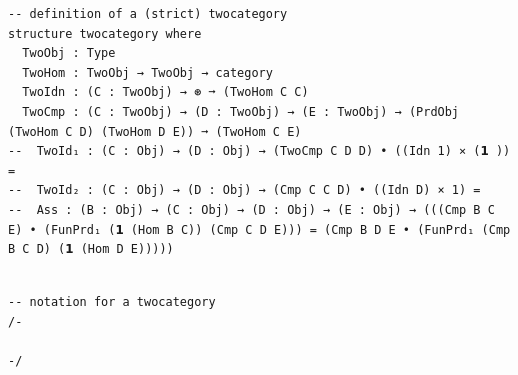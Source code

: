 \documentclass{book}
\newcounter{lcounter}
\newcounter{sectioncount}
\newcounter{subsectioncount}
\renewcommand{\section}[1]{\newpage
\ \\
\ \\
 \begin{center} \scalebox{1.5}{\texttt{\thesectioncount . #1}} \setcounter{sectioncount}{\thesectioncount+1} \setcounter{subsectioncount}{1} \end{center}
 \begin{center}

\ \\
\ \\

\thispagestyle{empty}
\end{center}
}
\begin{document}
\section{\texttt{twocategory}} %


\begin{center}
\begin{tcolorbox}[width=5in,colback={white},title={\begin{center}\texttt{Lean \thelcounter} \addtocounter{lcounter}{1}  \end{center}},colbacktitle=Blue,coltitle=black]
\begin{verbatim}

-- definition of a (strict) twocategory
structure twocategory where
  TwoObj : Type
  TwoHom : TwoObj → TwoObj → category
  TwoIdn : (C : TwoObj) → ⊛ ➞ (TwoHom C C)
  TwoCmp : (C : TwoObj) → (D : TwoObj) → (E : TwoObj) → (PrdObj (TwoHom C D) (TwoHom D E)) ➞ (TwoHom C E)
--  TwoId₁ : (C : Obj) → (D : Obj) → (TwoCmp C D D) • ((Idn 1) ⨯ (𝟭 )) = 
--  TwoId₂ : (C : Obj) → (D : Obj) → (Cmp C C D) • ((Idn D) × 1) = 
--  Ass : (B : Obj) → (C : Obj) → (D : Obj) → (E : Obj) → (((Cmp B C E) • (FunPrd₁ (𝟭 (Hom B C)) (Cmp C D E))) = (Cmp B D E • (FunPrd₁ (Cmp B C D) (𝟭 (Hom D E)))))

\end{verbatim}%
\end{tcolorbox}
\end{center}


\begin{center}
\begin{tcolorbox}[width=5in,colback={white},title={\begin{center}\texttt{Lean \thelcounter} \addtocounter{lcounter}{1}  \end{center}},colbacktitle=Blue,coltitle=black]
\begin{verbatim}

-- notation for a twocategory
/-

-/

\end{verbatim}%
\end{tcolorbox}
\end{center}


\section{\texttt{Two}} %
\end{document}
